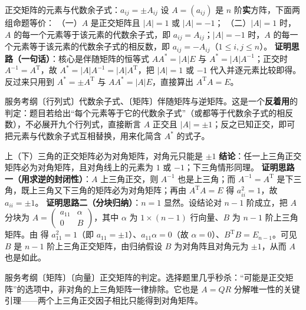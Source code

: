 \begin{fdeep}{正交矩阵的元素与代数余子式：$a_{ij}=\pm A_{ij}$}
设 $A=(a_{ij})$ 是 $n$ 阶\textbf{实}方阵，下面两组命题等价：
（一）$A$ 是正交矩阵且 $|A|=1$ 或 $|A|=-1$；
（二）$|A|=1$ 时，$A$ 的每一个元素等于该元素的代数余子式，即 $a_{ij}=A_{ij}$；$|A|=-1$ 时，$A$ 的每一个元素等于该元素的代数余子式的相反数，即 $a_{ij}=-A_{ij}$（$1\le i,j\le n$）。
\textbf{证明思路（一句话）}：核心是伴随矩阵的恒等式 $AA^{*}=|A|E$ 与 $A^{*}=|A|A^{-1}$；正交时 $A^{-1}=A^{\mathrm T}$，故 $A^{*}=|A|A^{-1}=|A|A^{\mathrm T}$，把 $|A|=1$ 或 $-1$ 代入并逐元素比较即得。反过来只用到 $A^{*}=\pm A^{\mathrm T}$ 与 $AA^{*}=|A|E$，直接算出 $A^{\mathrm T}A=E$。

\fbref{}服务考纲〔行列式〕代数余子式、〔矩阵〕伴随矩阵与逆矩阵。这是一个\textbf{反着用}的判定：题目若给出“每个元素等于它的代数余子式”（或都等于代数余子式的相反数），不必展开九个行列式，直接断言 $A$ 正交且 $|A|=\pm1$；反之已知正交，即可把元素与代数余子式互相替换，用来化简含 $A^{*}$ 的式子。
\end{fdeep}

\begin{fdeep}{上（下）三角的正交矩阵必为对角矩阵，对角元只能是 $\pm1$}
\textbf{结论}：任一上三角正交矩阵必为对角矩阵，且对角线上的元素为 $1$ 或 $-1$；下三角情形同理。
\textbf{证明思路一（用求逆的封闭性）}：$A$ 上三角正交，则 $A^{-1}$ 也是上三角；而 $A^{-1}=A^{\mathrm T}$ 是下三角，既上三角又下三角的矩阵必为对角矩阵；再由 $A^{\mathrm T}A=E$ 得 $a_{ii}^{2}=1$，故 $a_{ii}=\pm1$。
\textbf{证明思路二（分块归纳）}：$n=1$ 显然。设结论对 $n-1$ 阶成立，把 $A$ 分块为 $A=\begin{pmatrix}a_{11}&\alpha\\ 0&B\end{pmatrix}$，其中 $\alpha$ 为 $1\times(n-1)$ 行向量、$B$ 为 $n-1$ 阶上三角矩阵。由
得 $a_{11}^{2}=1$（即 $a_{11}=\pm1$）、$a_{11}\alpha=0$（故 $\alpha=0$）、$B^{\mathrm T}B=E_{n-1}$。可见 $B$ 是 $n-1$ 阶上三角正交矩阵，由归纳假设 $B$ 为对角阵且对角元为 $\pm1$，从而 $A$ 也是如此。

\fbref{}服务考纲〔矩阵〕〔向量〕正交矩阵的判定。选择题里几乎秒杀：“可能是正交矩阵”的选项中，非对角的上三角矩阵一律排除。它也是 $A=QR$ 分解唯一性的关键引理——两个上三角正交因子相比只能得到对角矩阵。
\end{fdeep}

